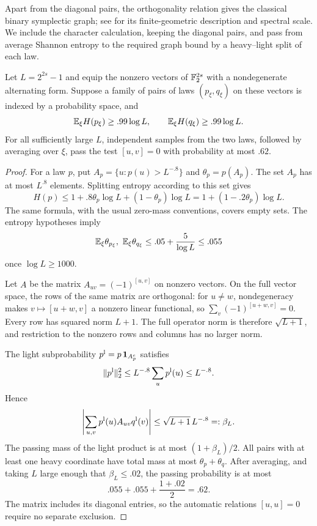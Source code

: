 Apart from the diagonal pairs, the orthogonality relation gives the
classical binary symplectic graph; see \cite[Definition~3.3 and Theorem~3.4]{Seidel1973} for its
finite-geometric description and spectral scale. We include the
character calculation, keeping the diagonal pairs, and pass from
average Shannon entropy to the required graph bound by a heavy--light
split of each law.

\begin{lemma}\label{lem:graph-independent}
Let $L=2^{2s}-1$ and equip the nonzero vectors of
$\mathbb F_2^{2s}$ with a nondegenerate alternating form.
Suppose a family of pairs of laws $(p_\xi,q_\xi)$ on these
vectors is indexed by a probability space, and
\[
 \mathbb E_\xi H(p_\xi)\ge .99\log L,\qquad
 \mathbb E_\xi H(q_\xi)\ge .99\log L.
\]
For all sufficiently large $L$, independent samples from the
two laws, followed by averaging over $\xi$, pass the test
$[u,v]=0$ with probability at most $.62$.
\end{lemma}

\begin{proof}
For a law $p$, put
$A_p=\{u:p(u)>L^{-.8}\}$ and $\theta_p=p(A_p)$.
The set $A_p$ has at most $L^{.8}$ elements. Splitting entropy
according to this set gives
\begin{equation}\label{eq:heavy-entropy}
 H(p)\le1+.8\theta_p\log L+(1-\theta_p)\log L
      =1+(1-.2\theta_p)\log L.
\end{equation}
The same formula, with the usual zero-mass conventions, covers
empty sets. The entropy hypotheses imply
\[
 \mathbb E_\xi\theta_{p_\xi},\ \mathbb E_\xi\theta_{q_\xi}
 \le .05+\frac5{\log L}\le .055
\]
once $\log L\ge1000$.

Let $A$ be the matrix $A_{uv}=(-1)^{[u,v]}$ on nonzero
vectors. On the full vector space, the rows of the same matrix
are orthogonal: for $u\ne w$, nondegeneracy makes
$v\mapsto[u+w,v]$ a nonzero linear functional, so
$\sum_v(-1)^{[u+w,v]}=0$. Every row has squared norm $L+1$.
The full operator norm is therefore $\sqrt{L+1}$, and restriction
to the nonzero rows and columns has no larger norm.

The light subprobability $p^{\rm l}=p\,\mathbf 1_{A_p^c}$
satisfies
\[
 \|p^{\rm l}\|_2^2
 \le L^{-.8}\sum_u p^{\rm l}(u)\le L^{-.8}.
\]
Hence
\[
 \left|\sum_{u,v}p^{\rm l}(u)A_{uv}q^{\rm l}(v)\right|
 \le\sqrt{L+1}\,L^{-.8}=:\beta_L.
\]
The passing mass of the light product is at most
$(1+\beta_L)/2$. All pairs with at least one heavy coordinate
have total mass at most $\theta_p+\theta_q$.
After averaging, and taking $L$ large enough that
$\beta_L\le .02$, the passing probability is at most
\[
 .055+.055+\frac{1+.02}{2}=.62.
\]
The matrix includes its diagonal entries, so the automatic
relations $[u,u]=0$ require no separate exclusion.
\end{proof}

